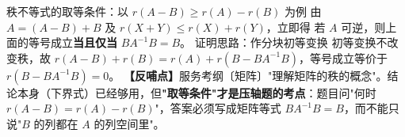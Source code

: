 \begin{fdeep}{秩不等式的取等条件：以 $r(A-B)\ge r(A)-r(B)$ 为例}
由 $A=(A-B)+B$ 及 $r(X+Y)\le r(X)+r(Y)$，立即得
若 $A$ 可逆，则上面的等号成立\textbf{当且仅当} $BA^{-1}B=B$。
证明思路：作分块初等变换
初等变换不改变秩，故 $r(A-B)+r(B)=r(A)+r(B-BA^{-1}B)$，等号成立等价于 $r(B-BA^{-1}B)=0$。
\textbf{【反哺点】}服务考纲〔矩阵〕"理解矩阵的秩的概念"。结论本身（下界式）已经够用，但\textbf{"取等条件"才是压轴题的考点}：题目问"何时 $r(A-B)=r(A)-r(B)$"，答案必须写成矩阵等式 $BA^{-1}B=B$，而不能只说"$B$ 的列都在 $A$ 的列空间里"。
\end{fdeep}


